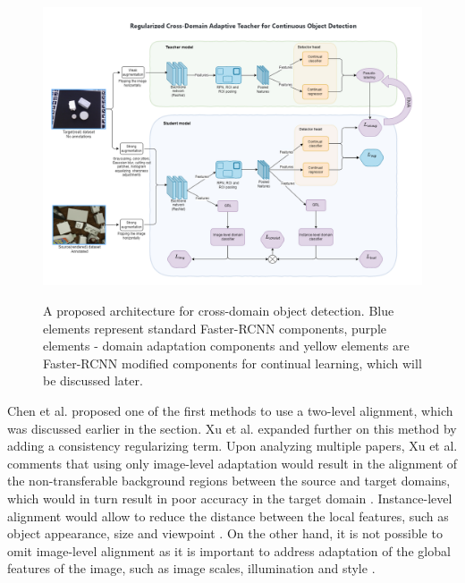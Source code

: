 \begin{figure}[htb]
	\begin{center}
		\includegraphics[width=16cm]{./MyModel.png}
	\end{center}
	\caption{A proposed architecture for cross-domain object detection. Blue elements represent standard Faster-RCNN components, purple elements - domain adaptation components and yellow elements are Faster-RCNN modified components for continual learning, which will be discussed later.}
	\begin{center}
		\label{mymodel}
	\end{center}
\end{figure}

Chen et al. \cite{Chen2018} proposed one of the first methods to use a two-level alignment, which was discussed earlier in the  section. Xu et al. \cite{Xu2020} expanded further on this method by adding a consistency regularizing term. Upon analyzing multiple papers, Xu et al. comments that using only image-level adaptation would result in the alignment of the non-transferable background regions between the source and target domains, which would in turn result in poor accuracy in the target domain \cite{Xu2020}. Instance-level alignment would allow to reduce the distance between the local features, such as object appearance, size and viewpoint \cite{Chen2018}. On the other hand, it is not possible to omit image-level alignment as it is important to address adaptation of the global features of the image, such as image scales, illumination and style \cite{Chen2018}. 

